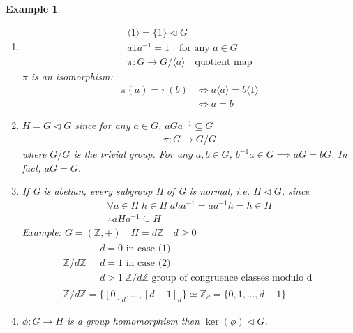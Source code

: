 \documentclass[11pt, oneside]{book}
\theoremstyle{break}
\newtheorem{eg}{Example}[section]
\newcommand{\bb}[1]{\mathbb{#1}}			%
\begin{document}
\begin{eg}
    \begin{enumerate}
            \item
                \begin{gather*}
                    \langle 1 \rangle = \{ 1 \} \triangleleft G \\
                    a1a^{-1} = 1 \quad \text{for any $a \in G$} \\
                    \pi : G \to G/\langle a \rangle \quad \text{quotient map}
                \end{gather*}
                $\pi$ is an isomorphism:
                \begin{align*}
                    \pi(a) = \pi(b) &\iff a \langle a \rangle = b \langle 1 \rangle \\
                        &\iff a = b
                \end{align*}
            \item $H = G \triangleleft G$ since for any $a \in G$, $aGa^{-1} \subseteq G$
                \begin{gather*}
                    \pi : G \to G/G
                \end{gather*}
                where $G/G$ is the trivial group. For any $a, b \in G$, $b^{-1}a \in G \implies aG = bG$. In fact, $aG = G$.
            \item If G is abelian, every subgroup H of G is normal, i.e. $H \triangleleft G$, since
                \begin{gather*}
                    \forall a \in H \; h \in H \; aha^{-1} = aa^{-1}h = h \in H \\
                    \therefore aHa^{-1} \subseteq H
                \end{gather*}
                Example: $G = (\bb{Z}, +) \quad H = d\bb{Z} \quad d \geq 0$
                \begin{gather*}
                    \bb{Z}/d\bb{Z} \quad \substack{d = 0 \text{ in case (1)} \\ d = 1 \text{ in case (2)} \\ d > 1 \; \bb{Z}/d\bb{Z} \text{ group of congruence classes modulo d}} \\
                    \bb{Z} / d\bb{Z} = \{[0]_d, ..., [d-1]_d \} \simeq \bb{Z}_d = \{0, 1, ..., d - 1 \}
                \end{gather*}

                \item $\phi : G \to H$ is a group homomorphism then $\ker(\phi) \triangleleft G$.


\end{enumerate}
\end{eg}
\end{document}
